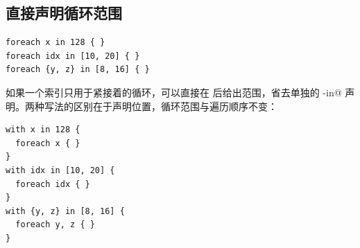 \subsection*{直接声明循环范围}

\begin{lstlisting}[language=croqtile,caption={一个 foreach 循环}]
foreach x in 128 { }
foreach idx in [10, 20] { }
foreach {y, z} in [8, 16] { }
\end{lstlisting}

如果一个索引只用于紧接着的循环，可以直接在 \co@foreach@ 后给出范围，省去单独的 \co@with-in@ 声明。两种写法的区别在于声明位置，循环范围与遍历顺序不变：

\begin{lstlisting}[language=croqtile,caption={它展开成的 with-in 形式}]
with x in 128 {
  foreach x { }
}
with idx in [10, 20] {
  foreach idx { }
}
with {y, z} in [8, 16] {
  foreach y, z { }
}
\end{lstlisting}
